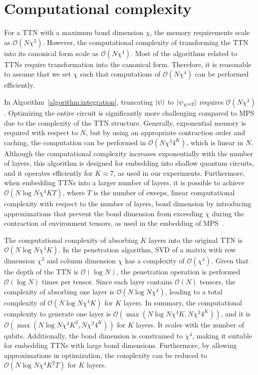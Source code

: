 \documentclass[12pt,dvipdfmx,twoside,openright]{report}
\begin{document}
\section{Computational complexity}
For a TTN with a maximum bond dimension $\chi$, the memory requirements scale as $\mathcal{O}(N\chi^3)$.
However, the computational complexity of transforming the TTN into its canonical form scale as $\mathcal{O}(N\chi^4)$.
Most of the algorithms related to TTNs require transformation into the canonical form.
Therefore, it is reasonable to assume that we set $\chi$ such that computations of $\mathcal{O}(N\chi^4)$ can be performed efficiently.

In Algorithm~\ref{algorithm:integration}, truncating $\ket{\psi}$ to $\ket{\psi_{\chi=2}}$ requires $\mathcal{O}(N\chi^3)$.
Optimizing the entire circuit is significantly more challenging compared to MPS due to the complexity of the TTN structure.
Generally, exponential memory is required with respect to $N$, but by using an appropriate contraction order and caching, the computation can be performed in $\mathcal{O}(N\chi^3 4^K)$, which is linear in $N$.
Although the computational complexity increases exponentially with the number of layers, this algorithm is designed for embedding into shallow quantum circuits, and it operates efficiently for $K \approx 7$, as used in our experiments.
Furthermore, when embedding TTNs into a larger number of layers, it is possible to achieve $\mathcal{O}(N\log{N}\chi^4KT)$, where $T$ is the number of sweeps, linear computational complexity with respect to the number of layers, bond dimension by introducing approximations that prevent the bond dimension from exceeding $\chi$ during the contraction of environment tensors, as used in the embedding of MPS~\cite{mpsdecomp}.

The computational complexity of absorbing $K$ layers into the original TTN is $\mathcal{O}(N\log{N}\chi^4K)$.
In the penetration algorithm, SVD of a matrix with row dimension $\chi^2$ and column dimension $\chi$ has a complexity of $\mathcal{O}(\chi^4)$.
Given that the depth of the TTN is $\mathcal{O}(\log{N})$, the penetration operation is performed $\mathcal{O}(\log{N})$ times per tensor.
Since each layer contains $\mathcal{O}(N)$ tensors, the complexity of absorbing one layer is $\mathcal{O}(N\log{N}\chi^4)$, leading to a total complexity of $\mathcal{O}(N\log{N}\chi^4K)$ for $K$ layers.
In summary, the computational complexity to generate one layer is $\mathcal{O}(\max (N\log{N}\chi^4 K, N\chi^3 4^K))$, and it is $\mathcal{O}(\max (N\log{N}\chi^4 K^2, N\chi^3 4^K))$ for $K$ layers.
It scales with the number of qubits.
Additionally, the bond dimension is constrained to $\chi^4$, making it suitable for embedding TTNs with large bond dimensions.
Furthermore, by allowing approximations in optimization, the complexity can be reduced to $\mathcal{O}(N\log{N}\chi^4 K^2T)$ for $K$ layers.
\end{document}

